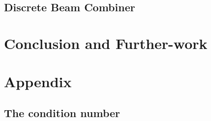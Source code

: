 \documentclass[a4paper,twoside,11pt]{article}
\makeatletter
\newcommand\backmatter{%
  \if@openright
    \clearpage
  \else
    \clearpage
  \fi
   }
\makeatother
\begin{document}
    \subsection{Discrete Beam Combiner}

\section*{Conclusion and Further-work}

\backmatter
\appendix
\section{Appendix}
    \subsection{The condition number}\label{an:cond}
    

\printglossary
    


\end{document}

